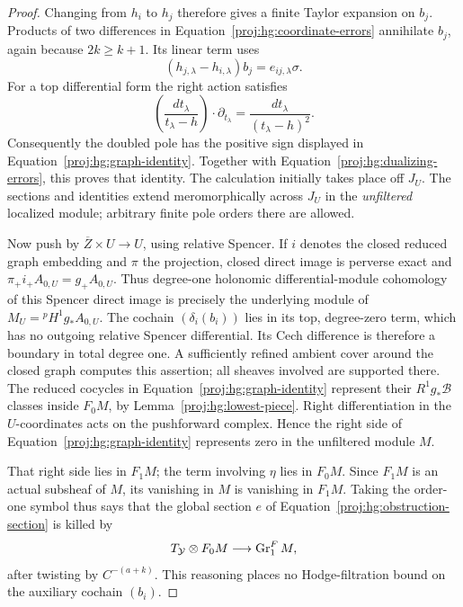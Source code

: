 \begin{proof}
Changing from \(h_i\) to \(h_j\) therefore gives a finite Taylor
expansion on \(b_j\).  Products of two differences in
Equation~\eqref{proj:hg:coordinate-errors} annihilate \(b_j\), again
because \(2k\geq k+1\).  Its linear term uses
\[
 (h_{j,\lambda}-h_{i,\lambda})b_j
       =e_{ij,\lambda}\sigma.
\]
For a top differential form the right action satisfies
\[
 \left(\frac{dt_\lambda}{t_\lambda-h}\right)
       \cdot\partial_{t_\lambda}
   =\frac{dt_\lambda}{(t_\lambda-h)^2}.
\]
Consequently the doubled pole has the positive sign displayed in
Equation~\eqref{proj:hg:graph-identity}.  Together with
Equation~\eqref{proj:hg:dualizing-errors}, this proves that identity.
The calculation initially takes place off \(J_U\).  The sections
and identities extend meromorphically across \(J_U\) in the
\emph{unfiltered} localized module; arbitrary finite pole orders
there are allowed.

Now push by \(\overline Z\times U\to U\), using relative
Spencer.  If \(i\) denotes the closed reduced graph embedding and
\(\pi\) the projection, closed direct image is perverse exact and
\(\pi_+i_+A_{0,U}=g_+A_{0,U}\).  Thus degree-one holonomic
differential-module cohomology of this Spencer direct image is
precisely the underlying module of
\(M_U={}^{p}\!H^1g_*A_{0,U}\).
The cochain \((\delta_i(b_i))\) lies in its top,
degree-zero term, which has no outgoing relative Spencer
differential.  Its Cech difference is therefore a boundary in
total degree one.  A sufficiently refined ambient cover around
the closed graph computes this assertion; all sheaves involved
are supported there.  The reduced cocycles in
Equation~\eqref{proj:hg:graph-identity} represent their
\(R^1g_*\mathcal B\) classes inside \(F_0M\), by
Lemma~\ref{proj:hg:lowest-piece}.  Right differentiation in the
\(U\)-coordinates acts on the pushforward complex.
Hence the right side of Equation~\eqref{proj:hg:graph-identity}
represents zero in the unfiltered module \(M\).

That right side lies in \(F_1M\); the term involving \(\eta\)
lies in \(F_0M\).  Since \(F_1M\) is an actual subsheaf of \(M\),
its vanishing in \(M\) is vanishing in \(F_1M\).  Taking the
order-one symbol thus says that the global section \(e\) of
Equation~\eqref{proj:hg:obstruction-section} is killed by
\begin{equation}\label{proj:hg:symbol-map}
 T_{\mathcal Y}\otimes F_0M
           \longrightarrow \operatorname{Gr}^F_1M,
\end{equation}
after twisting by \(C^{-(a+k)}\).
This reasoning places no Hodge-filtration bound on the
auxiliary cochain \((b_i)\).


\end{proof}
